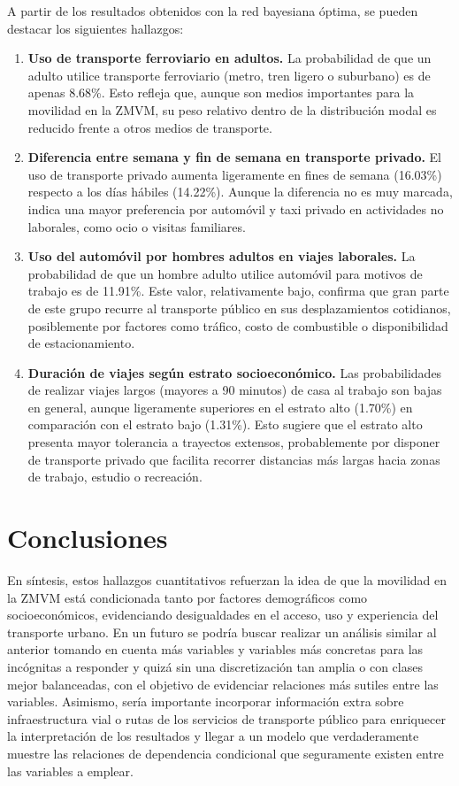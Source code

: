 \documentclass[twocolumn]{article}
\begin{document}
A partir de los resultados obtenidos con la red bayesiana óptima, se pueden destacar los siguientes hallazgos:
\begin{enumerate}
    \item \textbf{Uso de transporte ferroviario en adultos.}  
    La probabilidad de que un adulto utilice transporte ferroviario (metro, tren ligero o suburbano) es de apenas 8.68\%. Esto refleja que, aunque son medios importantes para la movilidad en la ZMVM, su peso relativo dentro de la distribución modal es reducido frente a otros medios de transporte.

    \item \textbf{Diferencia entre semana y fin de semana en transporte privado.}  
    El uso de transporte privado aumenta ligeramente en fines de semana (16.03\%) respecto a los días hábiles (14.22\%). Aunque la diferencia no es muy marcada, indica una mayor preferencia por automóvil y taxi privado en actividades no laborales, como ocio o visitas familiares.

    \item \textbf{Uso del automóvil por hombres adultos en viajes laborales.}  
    La probabilidad de que un hombre adulto utilice automóvil para motivos de trabajo es de 11.91\%. Este valor, relativamente bajo, confirma que gran parte de este grupo recurre al transporte público en sus desplazamientos cotidianos, posiblemente por factores como tráfico, costo de combustible o disponibilidad de estacionamiento.

    \item \textbf{Duración de viajes según estrato socioeconómico.}  
    Las probabilidades de realizar viajes largos (mayores a 90 minutos) de casa al trabajo son bajas en general, aunque ligeramente superiores en el estrato alto (1.70\%) en comparación con el estrato bajo (1.31\%). Esto sugiere que el estrato alto presenta mayor tolerancia a trayectos extensos, probablemente por disponer de transporte privado que facilita recorrer distancias más largas hacia zonas de trabajo, estudio o recreación.
\end{enumerate}
\section{Conclusiones}
En síntesis, estos hallazgos cuantitativos refuerzan la idea de que la movilidad en la ZMVM está condicionada tanto por factores demográficos como socioeconómicos, evidenciando desigualdades en el acceso, uso y experiencia del transporte urbano.
En un futuro se podría buscar realizar un análisis similar al anterior tomando en cuenta más variables y variables más concretas para las incógnitas a responder y quizá sin una discretización tan amplia o con clases mejor balanceadas, con el objetivo de evidenciar relaciones más sutiles entre las variables. Asimismo, sería importante incorporar información extra sobre infraestructura vial o rutas de los servicios de transporte público para enriquecer la interpretación de los resultados y llegar a un modelo que verdaderamente muestre las relaciones de dependencia condicional que seguramente existen entre las variables a emplear.
\end{document}

